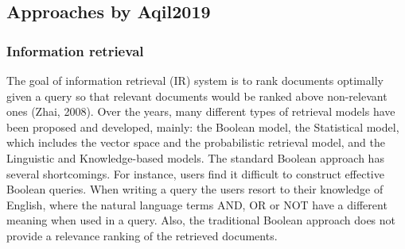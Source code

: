 \documentclass{article}
\begin{document}
\subsection{Approaches by Aqil2019}
\subsubsection{Information retrieval}
The goal of information retrieval (IR) system is to rank documents optimally given a query so that relevant documents would be
ranked above non-relevant ones (Zhai, 2008). Over the years, many different types of retrieval models have been proposed and
developed, mainly: the Boolean model, the Statistical model, which includes the vector space and the probabilistic retrieval model,
and the Linguistic and Knowledge-based models. The standard Boolean approach has several shortcomings. For instance, users find it
difficult to construct effective Boolean queries. When writing a query the users resort to their knowledge of English, where the natural
language terms AND, OR or NOT have a different meaning when used in a query. Also, the traditional Boolean approach does not provide a relevance ranking of the retrieved documents.
\end{document}
